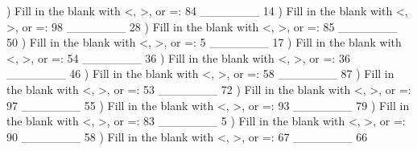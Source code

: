 \documentclass{article}%
\begin{document}
) Fill in the blank with <, >, or =: 84 \_\_\_\_\_\_\_ 14%
\newline%
\newline%
) Fill in the blank with <, >, or =: 98 \_\_\_\_\_\_\_ 28%
\newline%
\newline%
) Fill in the blank with <, >, or =: 85 \_\_\_\_\_\_\_ 50%
\newline%
\newline%
) Fill in the blank with <, >, or =: 5 \_\_\_\_\_\_\_ 17%
\newline%
\newline%
) Fill in the blank with <, >, or =: 54 \_\_\_\_\_\_\_ 36%
\newline%
\newline%
) Fill in the blank with <, >, or =: 36 \_\_\_\_\_\_\_ 46%
\newline%
\newline%
) Fill in the blank with <, >, or =: 58 \_\_\_\_\_\_\_ 87%
\newline%
\newline%
) Fill in the blank with <, >, or =: 53 \_\_\_\_\_\_\_ 72%
\newline%
\newline%
) Fill in the blank with <, >, or =: 97 \_\_\_\_\_\_\_ 55%
\newline%
\newline%
) Fill in the blank with <, >, or =: 93 \_\_\_\_\_\_\_ 79%
\newline%
\newline%
) Fill in the blank with <, >, or =: 83 \_\_\_\_\_\_\_ 5%
\newline%
\newline%
) Fill in the blank with <, >, or =: 90 \_\_\_\_\_\_\_ 58%
\newline%
\newline%
) Fill in the blank with <, >, or =: 67 \_\_\_\_\_\_\_ 66%
\end{document}
